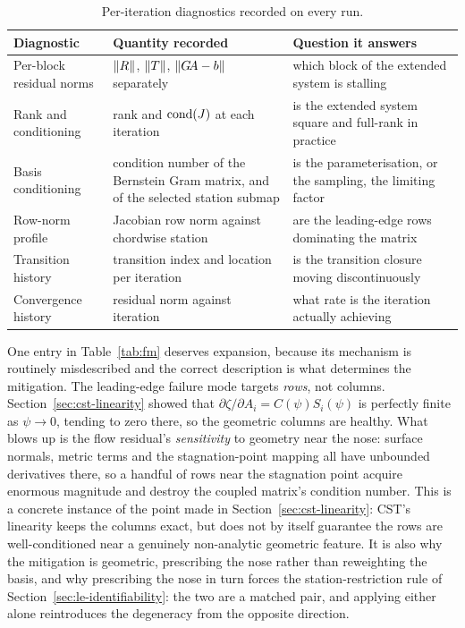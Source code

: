 \begin{table}[htbp]
\centering
\caption{Per-iteration diagnostics recorded on every run.}
\label{tab:diagnostics}
\footnotesize
\begin{tabularx}{\textwidth}{@{}l L L@{}}
\toprule
Diagnostic & Quantity recorded & Question it answers \\
\midrule
Per-block residual norms & $\left\|R\right\|$, $\left\|T\right\|$, $\left\|G\!A-b\right\|$ separately & which block of the extended system is stalling \\
Rank and conditioning & rank and $\operatorname{cond}(J)$ at each iteration & is the extended system square and full-rank in practice \\
Basis conditioning & condition number of the Bernstein Gram matrix, and of the selected station submap & is the parameterisation, or the sampling, the limiting factor \\
Row-norm profile & Jacobian row norm against chordwise station & are the leading-edge rows dominating the matrix \\
Transition history & transition index and location per iteration & is the transition closure moving discontinuously \\
Convergence history & residual norm against iteration & what rate is the iteration actually achieving \\
\bottomrule
\end{tabularx}
\end{table}

One entry in Table~\ref{tab:fm} deserves expansion, because its mechanism is
routinely misdescribed and the correct description is what determines the
mitigation. The leading-edge failure mode targets \emph{rows}, not columns.
Section~\ref{sec:cst-linearity} showed that
$\partial\zeta/\partial A_i = C(\psi)S_i(\psi)$ is perfectly finite as
$\psi\to0$, tending to zero there, so the geometric columns are healthy. What
blows up is the flow residual's \emph{sensitivity} to geometry near the nose:
surface normals, metric terms and the stagnation-point mapping all have
unbounded derivatives there, so a handful of rows near the stagnation point
acquire enormous magnitude and destroy the coupled matrix's condition number.
This is a concrete instance of the point made in
Section~\ref{sec:cst-linearity}: CST's linearity keeps the columns exact, but
does not by itself guarantee the rows are well-conditioned near a genuinely
non-analytic geometric feature. It is also why the mitigation is geometric,
prescribing the nose rather than reweighting the basis, and why prescribing
the nose in turn forces the station-restriction rule of
Section~\ref{sec:le-identifiability}: the two are a matched pair, and applying
either alone reintroduces the degeneracy from the opposite direction.

